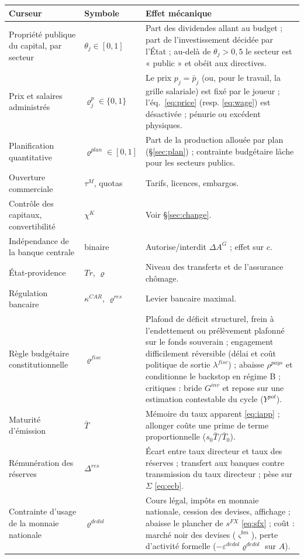 \documentclass[11pt,a4paper]{article}
\newcommand{\og}{« }
\newcommand{\fg}{ »}
\begin{document}
\begin{center}\small
\begin{tabular}{p{3.6cm}p{1.6cm}p{9.6cm}}
\toprule
\textbf{Curseur} & \textbf{Symbole} & \textbf{Effet mécanique}\\
\midrule
Propriété publique du capital, par secteur & $\theta_j \in[0,1]$ & Part des dividendes allant au budget ; part de l'investissement décidée par l'État ; au-delà de $\theta_j > 0{,}5$ le secteur est \og public\fg{} et obéit aux directives.\\
Prix et salaires administrés & $\varrho^p_j \in\{0,1\}$ & Le prix $p_j = \bar p_j$ (ou, pour le travail, la grille salariale) est fixé par le joueur ; l'éq.~\eqref{eq:price} (resp. \eqref{eq:wage}) est désactivée ; pénurie ou excédent physiques.\\
Planification quantitative & $\varrho^{plan}\in[0,1]$ & Part de la production allouée par plan (\S\ref{sec:plan}) ; contrainte budgétaire lâche pour les secteurs publics.\\
Ouverture commerciale & $\tau^M$, quotas & Tarifs, licences, embargos.\\
Contrôle des capitaux, convertibilité & $\chi^K$ & Voir \S\ref{sec:change}.\\
Indépendance de la banque centrale & binaire & Autorise/interdit $\Delta A^G$ ; effet sur $c$.\\
État-providence & $Tr$, $\varrho$ & Niveau des transferts et de l'assurance chômage.\\
Régulation bancaire & $\kappa^{CAR}$, $\varrho^{res}$ & Levier bancaire maximal.\\
Règle budgétaire constitutionnelle & $\varrho^{fisc}$ & Plafond de déficit structurel, frein à l'endettement ou prélèvement plafonné sur le fonds souverain ; engagement difficilement réversible (délai et coût politique de sortie $\lambda^{fisc}$) ; abaisse $\rho^{pays}$ et conditionne le backstop en régime B ; critiques : bride $G^{inv}$ et repose sur une estimation contestable du cycle ($Y^{pot}$).\\
Maturité d'émission & $\bar T$ & Mémoire du taux apparent \eqref{eq:iapp} ; allonger coûte une prime de terme proportionnelle ($s_0\bar T/\bar T_0$).\\
Rémunération des réserves & $\Delta^{res}$ & Écart entre taux directeur et taux des réserves ; transfert aux banques contre transmission du taux directeur ; pèse sur $\Sigma$ \eqref{eq:ecb}.\\
Contrainte d'usage de la monnaie nationale & $\varrho^{dedol}$ & Cours légal, impôts en monnaie nationale, cession des devises, affichage ; abaisse le plancher de $s^{FX}$ \eqref{eq:sfx} ; coût : marché noir des devises ($\varsigma^{bm}$), perte d'activité formelle ($-\varepsilon^{dedol}\varrho^{dedol}$ sur $A$).\\

\end{tabular}
\end{center}
\end{document}
